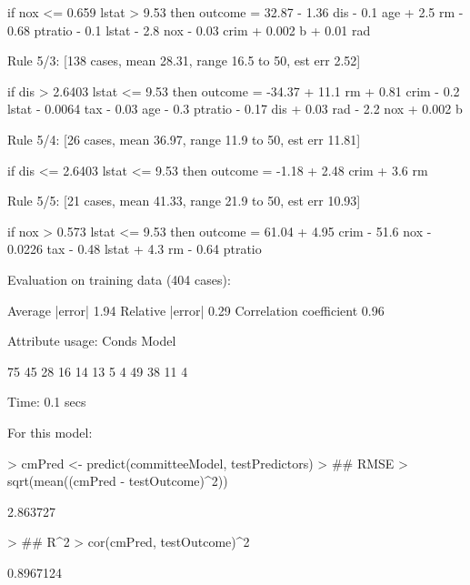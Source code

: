 \documentclass[12pt]{article}
\renewenvironment{Schunk}{\vspace{\topsep}}{\vspace{\topsep}}
\begin{document}
\begin{Schunk}
\begin{Soutput}
    if
	nox <= 0.659
	lstat > 9.53
    then
	outcome = 32.87 - 1.36 dis - 0.1 age + 2.5 rm - 0.68 ptratio - 0.1 lstat
	          - 2.8 nox - 0.03 crim + 0.002 b + 0.01 rad

  Rule 5/3: [138 cases, mean 28.31, range 16.5 to 50, est err 2.52]

    if
	dis > 2.6403
	lstat <= 9.53
    then
	outcome = -34.37 + 11.1 rm + 0.81 crim - 0.2 lstat - 0.0064 tax
	          - 0.03 age - 0.3 ptratio - 0.17 dis + 0.03 rad - 2.2 nox
	          + 0.002 b

  Rule 5/4: [26 cases, mean 36.97, range 11.9 to 50, est err 11.81]

    if
	dis <= 2.6403
	lstat <= 9.53
    then
	outcome = -1.18 + 2.48 crim + 3.6 rm

  Rule 5/5: [21 cases, mean 41.33, range 21.9 to 50, est err 10.93]

    if
	nox > 0.573
	lstat <= 9.53
    then
	outcome = 61.04 + 4.95 crim - 51.6 nox - 0.0226 tax - 0.48 lstat
	          + 4.3 rm - 0.64 ptratio


Evaluation on training data (404 cases):

    Average  |error|               1.94
    Relative |error|               0.29
    Correlation coefficient        0.96


	Attribute usage:
	  Conds  Model

	   75%    98%    lstat
	   45%    61%    nox
	   28%    70%    rm
	   16%    86%    dis
	   14%    90%    ptratio
	   13%    76%    crim
	    5%    48%    tax
	    4%    58%    age
	          49%    b
	          38%    rad
	          11%    indus
	           4%    zn


Time: 0.1 secs
\end{Soutput}
\end{Schunk}

For this model:
\begin{Schunk}
\begin{Sinput}
> cmPred <- predict(committeeModel, testPredictors)
> ## RMSE
> sqrt(mean((cmPred - testOutcome)^2))
\end{Sinput}
\begin{Soutput}
[1] 2.863727
\end{Soutput}
\begin{Sinput}
> ## R^2
> cor(cmPred, testOutcome)^2
\end{Sinput}
\begin{Soutput}
[1] 0.8967124
\end{Soutput}
\end{Schunk}
\end{document}
